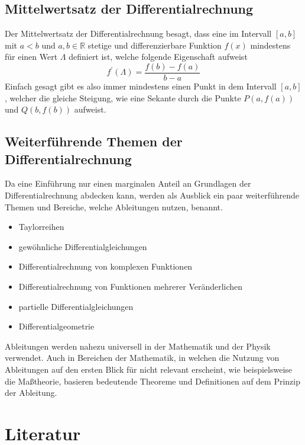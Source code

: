 \documentclass[11pt, a4paper]{report}
\begin{document}
\section*{Mittelwertsatz der Differentialrechnung}
Der Mittelwertsatz der Differentialrechnung besagt, dass eine im Intervall $\left[ a,b \right]$ mit $a<b$ und $a,b \in \mathbb{R}$ stetige und differenzierbare Funktion $f(x)$ mindestens für  einen Wert $\Lambda$ definiert ist, welche folgende Eigenschaft aufweist \cite[Seite 106]{Deitmar.2017}
\begin{equation}
f^{\prime}(\Lambda)= \dfrac{f(b)-f(a)}{b-a}
\end{equation}
Einfach gesagt gibt es also immer mindestens einen Punkt in dem Intervall $\left[ a,b \right]$, welcher die gleiche Steigung, wie eine Sekante durch die Punkte $P(a,f(a))$ und $Q(b,f(b))$ aufweist.


\section*{Weiterführende Themen der Differentialrechnung}
Da eine Einführung nur einen marginalen Anteil an Grundlagen der Differentialrechnung abdecken kann, werden als Ausblick ein paar weiterführende Themen und Bereiche, welche Ableitungen nutzen, benannt.\\ 
\begin{itemize}
	\item Taylorreihen
	\item gewöhnliche Differentialgleichungen
	\item Differentialrechnung von komplexen Funktionen
	\item Differentialrechnung von Funktionen mehrerer Veränderlichen
	\item partielle Differentialgleichungen
	\item Differentialgeometrie
\end{itemize}

Ableitungen werden nahezu universell in der Mathematik und der Physik verwendet. Auch in Bereichen der Mathematik, in welchen die Nutzung von Ableitungen auf den ersten Blick für nicht relevant erscheint, wie beispielsweise die Maßtheorie, basieren bedeutende Theoreme und Definitionen auf dem Prinzip  der Ableitung.
\newpage


\chapter*{Literatur}

\nocite{Borgwadt.1994}		%
\nocite{Deitmar.2017}		%
\nocite{FRITZSCHE.2020}		%
\nocite{Stewart.2015}		%
\nocite{Wendland.2005}		%
\nocite{Wikipedia.23.01.2020} %
\printbibliography[
	heading=subbibintoc,
	type=book,
	title={Bücher}
	]
\printbibliography[
	heading=subbibintoc,
	type=misc,
	title={Internetquellen}
	]
\end{document}
